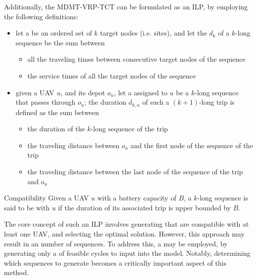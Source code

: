 \documentclass[a4paper, 12pt]{report}
\begin{document}

    Additionally, the MDMT-VRP-TCT can be formulated as an ILP, by employing the following definitions:

    \begin{itemize}
        \item let a  be an ordered set of $k$ target nodes (i.e. sites), and let the  $d_k$ of a $k$-long sequence be the sum between
            \begin{itemize}
                \item all the traveling times between consecutive target nodes of the sequence
                \item the service times of all the target nodes of the sequence
            \end{itemize}
        \item given a UAV $u$, and its depot $o_u$, let a  assigned to $u$ be a $k$-long sequence that passes through $o_u$; the duration $d_{k,u}$ of such a $(k + 1)$-long trip is defined as the sum between
            \begin{itemize}
                \item the duration of the $k$-long sequence of the trip
                \item the traveling distance between $o_u$ and the first node of the sequence of the trip
                \item the traveling distance between the last node of the sequence of the trip and $o_u$
            \end{itemize}
    \end{itemize}

    \begin{frameddefn}{Compatibility}
        Given a UAV $u$ with a battery capacity of $B$, a $k$-long sequence is said to be  with $u$ if the duration of its associated trip is upper bounded by $B$.
    \end{frameddefn}

    The core concept of such an ILP involves generating  that are compatible with at least one UAV, and selecting the optimal solution. However, this approach may result in an  number of sequences. To address this, a  may be employed, by generating only a  of feasible cycles to input into the model. Notably, determining which sequences to generate becomes a critically important aspect of this method.
\end{document}
